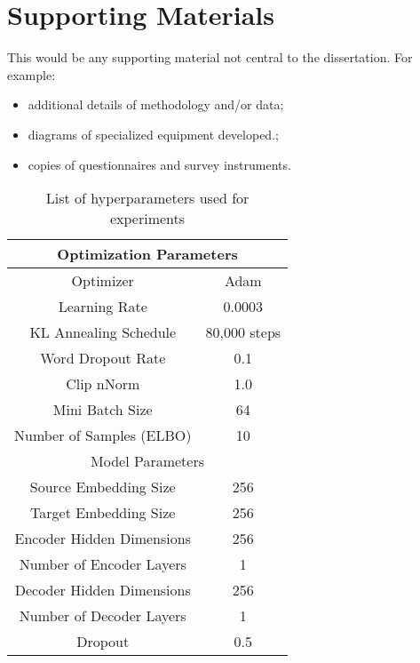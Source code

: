 \chapter{Supporting Materials}

This would be any supporting material not central to the dissertation.
For example:
\begin{itemize}
\item additional details of methodology and/or data;
\item diagrams of specialized equipment developed.;
\item copies of questionnaires and survey instruments.
\end{itemize}

\begin{table}[]
	\caption{List of hyperparameters used for experiments }
	\label{tab:hyperparams}
	\center
	\begin{tabular}{|c|c|}
		\hline
		\multicolumn{2}{|c|}{\textbf{Optimization Parameters}} \\ \hline
		Optimizer                        & Adam                \\ \hline
		Learning Rate                    & 0.0003              \\ \hline
		KL Annealing Schedule            & 80,000 steps        \\ \hline
		Word Dropout Rate                & 0.1                 \\ \hline
		Clip nNorm                        & 1.0                 \\ \hline
		Mini Batch Size                  & 64                  \\ \hline
		Number of Samples (ELBO)         & 10                  \\ \hline
		\multicolumn{2}{|c|}{Model Parameters}                 \\ \hline
		Source Embedding Size            & 256                 \\ \hline
		Target Embedding Size            & 256                 \\ \hline
		Encoder Hidden Dimensions        & 256                 \\ \hline
		Number of Encoder Layers         & 1                   \\ \hline
		Decoder Hidden Dimensions        & 256                 \\ \hline
		Number of Decoder Layers         & 1                   \\ \hline
		Dropout                          & 0.5                 \\ \hline

\end{tabular}
\end{table}
